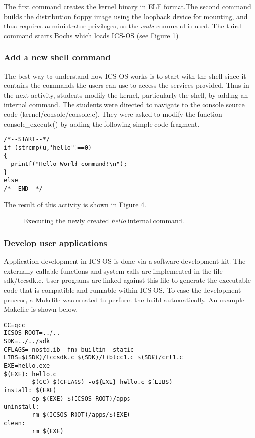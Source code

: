 \documentclass{acm_proc_article-sp}
\begin{document}
The first command creates the kernel binary in ELF format.The second command 
builds the distribution floppy image using the loopback device for mounting,
and thus requires administrator privileges, so the \textit{sudo} command is used.
The third command starts Bochs\cite{bochs:site} which loads ICS-OS (see 
Figure 1).

\subsubsection{Add a new shell command}
The best way to understand how ICS-OS works is to start with the shell since 
it contains the commands the users can use to access the services provided.
Thus in the next activity,  students modify the kernel,
particularly the shell, by adding an internal command. The students were
directed to navigate to the console source code (kernel/console/console.c). 
They were asked to modify the function console\_execute() by adding the 
following simple code fragment.

\begin{verbatim}
/*--START--*/
if (strcmp(u,"hello")==0)
{
  printf("Hello World command!\n");
}
else
/*--END--*/
\end{verbatim}

The result of this activity is shown in Figure 4.

\begin{figure}
\centering
{}
\caption{Executing the newly created \textit{hello} internal command.}
\end{figure}


\subsubsection{Develop user applications}
Application development in ICS-OS is done via a software development kit.
The externally callable functions and system calls are implemented in the file 
sdk/tccsdk.c. User programs are linked against this file to generate the
executable code that is compatible and runnable within ICS-OS. To ease the 
development process, a Makefile was created to perform the build
automatically. An example Makefile is shown below.

\begin{verbatim}
CC=gcc
ICSOS_ROOT=../..
SDK=../../sdk
CFLAGS=-nostdlib -fno-builtin -static
LIBS=$(SDK)/tccsdk.c $(SDK)/libtcc1.c $(SDK)/crt1.c
EXE=hello.exe
$(EXE): hello.c
        $(CC) $(CFLAGS) -o${EXE} hello.c $(LIBS)
install: $(EXE)
        cp $(EXE) $(ICSOS_ROOT)/apps
uninstall:
        rm $(ICSOS_ROOT)/apps/$(EXE)
clean:
        rm $(EXE)
\end{verbatim}
\end{document}
